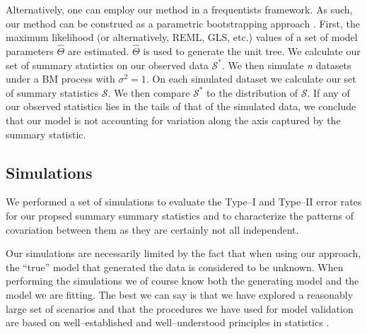 \documentclass[12pt]{article}
\begin{document}
Alternatively, one can employ our method in a frequentists framework. As such, our method can be construed as a parametric bootstrapping approach \citep{Efronbootstrap}. First, the maximum likelihood (or alternatively, REML, GLS, etc.) values of a set of model parameters $\hat{\Theta}$ are estimated. $\hat{\Theta}$ is used to  generate the unit tree. We calculate our set of summary statistics on our observed data $\mathcal{S}^*$. We then simulate \textit{n} datasets under a BM process with $\sigma^2 = 1$. On each simulated dataset we calculate our set of summary statistics $\mathcal{S}$. We then compare $\mathcal{S}^*$ to the distribution of $\mathcal{S}$. If any of our observed statistics lies in the tails of that of the simulated data, we conclude that our model is not accounting for variation along the axis captured by the summary statistic.


\subsection*{Simulations}

We performed a set of simulations to evaluate the Type--I and Type--II error rates for our propsed summary summary statistics and to characterize the patterns of covariation between them as they are certainly not all independent.

Our simulations are necessarily limited by the fact that when using our approach, the ``true'' model that generated the data is considered to be unknown. When performing the simulations we of course know both the generating model and the model we are fitting. The best we can say is that we have explored a reasonably large set of scenarios and that the procedures we have used for model validation are based on well--established and well--understood principles in statistics \citep[especially Bayesian statistics; e.g.][]{Gelmanbook}.
\end{document}
